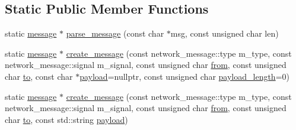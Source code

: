 \subsection*{Static Public Member Functions}
\begin{DoxyCompactItemize}
\item 
static \hyperlink{classbattleship_1_1network__message_1_1message}{message} $\ast$ \hyperlink{classbattleship_1_1network__message_1_1message_a8f87e24d9328257a0f76278a0802f86c}{parse\+\_\+message} (const char $\ast$msg, const unsigned char len)
\item 
static \hyperlink{classbattleship_1_1network__message_1_1message}{message} $\ast$ \hyperlink{classbattleship_1_1network__message_1_1message_aa50f58d9553f3532071c9acda7b1f031}{create\+\_\+message} (const network\+\_\+message\+::type m\+\_\+type, const network\+\_\+message\+::signal m\+\_\+signal, const unsigned char \hyperlink{classbattleship_1_1network__message_1_1message_af2ebed25f82de46c947a2241c6952563}{from}, const unsigned char \hyperlink{classbattleship_1_1network__message_1_1message_a36145cf7dfc9102da280adfad5d1a972}{to}, const char $\ast$\hyperlink{classbattleship_1_1network__message_1_1message_ab42ddf52012135284f65641702459912}{payload}=nullptr, const unsigned char \hyperlink{classbattleship_1_1network__message_1_1message_ac4a236888d40ffbdd8572660a3f34b1e}{payload\+\_\+length}=0)
\item 
static \hyperlink{classbattleship_1_1network__message_1_1message}{message} $\ast$ \hyperlink{classbattleship_1_1network__message_1_1message_aa55c4377f51cfd59e1d0c6abd4295d4f}{create\+\_\+message} (const network\+\_\+message\+::type m\+\_\+type, const network\+\_\+message\+::signal m\+\_\+signal, const unsigned char \hyperlink{classbattleship_1_1network__message_1_1message_af2ebed25f82de46c947a2241c6952563}{from}, const unsigned char \hyperlink{classbattleship_1_1network__message_1_1message_a36145cf7dfc9102da280adfad5d1a972}{to}, const std\+::string \hyperlink{classbattleship_1_1network__message_1_1message_ab42ddf52012135284f65641702459912}{payload})
\end{DoxyCompactItemize}
